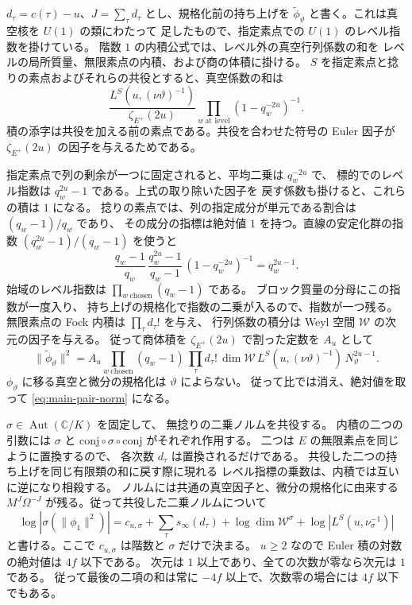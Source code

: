 \(d_\tau=c(\tau)-u\)、\(J=\sum_\tau d_\tau\) とし、規格化前の持ち上げを
\(\widetilde\phi_\vartheta\) と書く。これは真空核を \(U(1)\) の類にわたって
足したもので、指定素点での \(U(1)\) のレベル指数を掛けている。
階数 \(1\) の内積公式では、レベル外の真空行列係数の和を
レベルの局所質量、無限素点の内積、および商の体積に掛ける。
\(S\) を指定素点と捻りの素点およびそれらの共役とすると、真空係数の和は
\[
 \frac{L^S(u,(\nu\vartheta)^{-1})}{\zeta_{E^+}(2u)}
    \prod_{w\ \text{at\ level}}(1-q_w^{-2u})^{-1}.
\]
積の添字は共役を加える前の素点である。共役を合わせた符号の Euler 因子が
\(\zeta_{E^+}(2u)\) の因子を与えるためである。

指定素点で列の剰余が一つに固定されると、平均二乗は \(q_w^{-2u}\) で、
標的でのレベル指数は \(q_w^{2u}-1\) である。上式の取り除いた因子を
戻す係数も掛けると、これらの積は \(1\) になる。
捻りの素点では、列の指定成分が単元である割合は \((q_w-1)/q_w\) であり、
その成分の指標は絶対値 \(1\) を持つ。直線の安定化群の指数
\((q_w^{2u}-1)/(q_w-1)\) を使うと
\[
 \frac{q_w-1}{q_w}\,
 \frac{q_w^{2u}-1}{q_w-1}\,
 (1-q_w^{-2u})^{-1}=q_w^{2u-1}.
\]
始域のレベル指数は \(\prod_{w\ \mathrm{chosen}}(q_w-1)\) である。
ブロック質量の分母にこの指数が一度入り、
持ち上げの規格化で指数の二乗が入るので、指数が一つ残る。
無限素点の Fock 内積は \(\prod_\tau d_\tau!\) を与え、
行列係数の積分は Weyl 空間 \(\mathcal W\) の次元の因子を与える。
従って商体積を \(\zeta_{E^+}(2u)\) で割った定数を \(A_u\) として
\[
 \|\widetilde\phi_\vartheta\|^2
 = A_u \prod_{w\ \mathrm{chosen}}(q_w-1)\,
     \prod_\tau d_\tau!\,\dim\mathcal W\,
     L^S(u,(\nu\vartheta)^{-1})\,N_\vartheta^{2u-1}.
\]
\(\phi_\vartheta\) に移る真空と微分の規格化は \(\vartheta\) によらない。
従って比では消え、絶対値を取って \eqref{eq:main-pair-norm} になる。

\(\sigma\in\operatorname{Aut}(\mathbb C/K)\) を固定して、
無捻りの二乗ノルムを共役する。
内積の二つの引数には \(\sigma\) と
\(\mathrm{conj}\circ\sigma\circ\mathrm{conj}\) がそれぞれ作用する。
二つは \(E\) の無限素点を同じように置換するので、
各次数 \(d_\tau\) は置換されるだけである。
共役した二つの持ち上げを同じ有限類の和に戻す際に現れる
レベル指標の乗数は、内積では互いに逆になり相殺する。
ノルムには共通の真空因子と、微分の規格化に由来する
\(M^J\Omega^{-J}\) が残る。従って共役した二乗ノルムについて
\[
 \log|\sigma(\|\phi_1\|^2)|
   =c_{u,\sigma}+\sum_\tau s_\infty(d_\tau)+
      \log\dim\mathcal W^\sigma+\log|L^S(u,\nu_\sigma^{-1})|
\]
と書ける。ここで \(c_{u,\sigma}\) は階数と \(\sigma\) だけで決まる。
\(u\ge2\) なので Euler 積の対数の絶対値は \(4f\) 以下である。
次元は \(1\) 以上であり、全ての次数が零なら次元は \(1\) である。
従って最後の二項の和は常に \(-4f\) 以上で、次数零の場合には \(4f\) 以下でもある。
